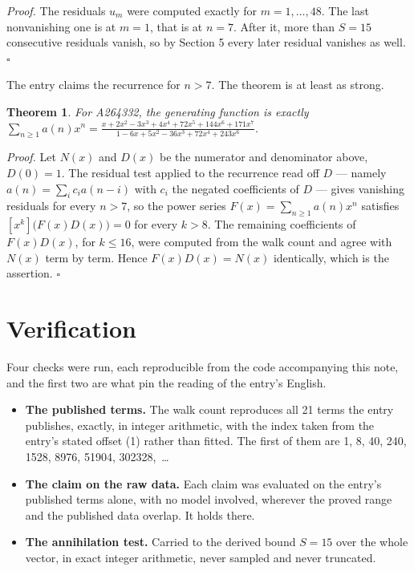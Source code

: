\documentclass[11pt]{article}
\newtheorem{theorem}{Theorem}
\theoremstyle{definition}
\begin{document}
{\itshape Proof.} The residuals $u_m$ were computed exactly for $m = 1,\dots,48$. The last nonvanishing one is at $m = 1$, that is at $n = 7$. After it, more than $S = 15$ consecutive residuals vanish, so by Section 5 every later residual vanishes as well. $\square$

The entry claims the recurrence for $n > 7$. The theorem is at least as strong.

\begin{theorem} For A264332, the generating function is exactly $\sum_{n\ge 1} a(n)x^n = \frac{x + 2x^{2} - 3x^{3} + 4x^{4} + 72x^{5} + 144x^{6} + 171x^{7}}{1 - 6x + 5x^{2} - 36x^{3} + 72x^{4} + 243x^{6}}$.\end{theorem}

{\itshape Proof.} Let $N(x)$ and $D(x)$ be the numerator and denominator above, $D(0)=1$. The residual test applied to the recurrence read off $D$ --- namely $a(n) = \sum_i c_i a(n-i)$ with $c_i$ the negated coefficients of $D$ --- gives vanishing residuals for every $n > 7$, so the power series $F(x)=\sum_{n\ge 1}a(n)x^n$ satisfies $[x^k]\bigl(F(x)D(x)\bigr) = 0$ for every $k > 8$. The remaining coefficients of $F(x)D(x)$, for $k \le 16$, were computed from the walk count and agree with $N(x)$ term by term. Hence $F(x)D(x) = N(x)$ identically, which is the assertion. $\square$

\section{Verification}

Four checks were run, each reproducible from the code accompanying this note, and the first two are what pin the reading of the entry's English.

\begin{itemize}

\item {\bfseries The published terms.} The walk count reproduces all 21 terms the entry publishes, exactly, in integer arithmetic, with the index taken from the entry's stated offset (1) rather than fitted. The first of them are 1, 8, 40, 240, 1528, 8976, 51904, 302328,~\dots

\item {\bfseries The claim on the raw data.} Each claim was evaluated on the entry's published terms alone, with no model involved, wherever the proved range and the published data overlap. It holds there.

\item {\bfseries The annihilation test.} Carried to the derived bound $S = 15$ over the whole vector, in exact integer arithmetic, never sampled and never truncated.

\end{itemize}
\end{document}
